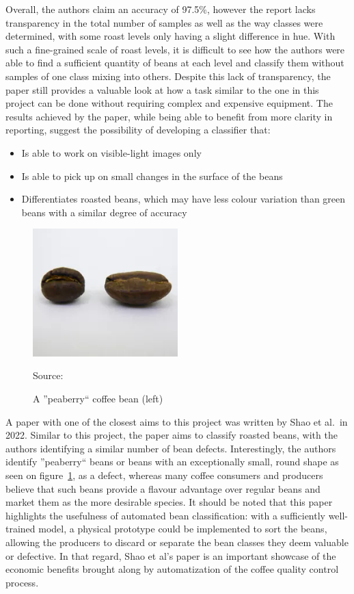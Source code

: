Overall, the authors claim an accuracy of 97.5\%, however the report lacks
transparency in the total number of samples as well as the way classes were
determined, with some roast levels only having a slight difference in hue.
With
such a fine-grained scale of roast levels, it is difficult to see how the authors
were able to find a sufficient quantity of beans at each level and classify them
without samples of one class mixing into others.
Despite this lack of
transparency, the paper still provides a valuable look at how a task similar to the
one in this project can be done without requiring complex and expensive equipment.
The results achieved by the paper, while being able to benefit from more clarity
in reporting, suggest the possibility of developing a classifier that:
\begin{itemize}
	\item Is able to work on visible-light images only

	\item Is able to pick up on small changes in the surface of the beans

	\item Differentiates roasted beans, which may have less colour variation than
		green beans with a similar degree of accuracy
\end{itemize}

\begin{figure}
	\includegraphics[width=0.5\textwidth]{figures/litReview/peaberry-vs-normal}
	\caption*
	{Source: \cite{peaberryImg}}
	\caption{A ''peaberry`` coffee bean (left)}
	\label{fig:peaberryComparison}
\end{figure}
A paper with one of the closest aims to this project was written by Shao et al.\ in
2022\cite{rgbDeepLearningShao}.
Similar to this project, the paper aims to
classify roasted beans, with the authors identifying a similar number of bean defects.
Interestingly, the authors identify ''peaberry`` beans or beans with an exceptionally
small, round shape as seen on figure~\ref{fig:peaberryComparison}, as a defect,
whereas many coffee consumers and producers believe that such beans provide a
flavour advantage over regular beans and market them as the more desirable
species.
It should be noted that this paper highlights the usefulness of automated
bean classification: with a sufficiently well-trained model, a physical prototype
could be implemented to sort the beans, allowing the producers to discard or
separate the bean classes they deem valuable or defective.
In that regard, Shao
et al's paper is an important showcase of the economic benefits brought along by
automatization of the coffee quality control process.

